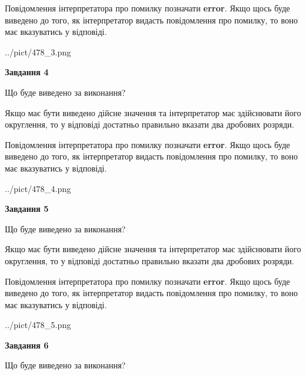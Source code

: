 \documentclass[12pt, ukrainian]{article}
\begin{document}
{\begin {Large}
Повідомлення інтерпретатора про помилку позначати \textbf{error}.
Якщо щось буде виведено до того, як інтерпретатор видасть повідомлення про помилку, 
то воно має вказуватись у відповіді. \par

\begin{center}
	{../pict/478_3.png}
\end{center}
\newpage

{\begin {center}\textbf{Завдання 4}\end {center}}\par
Що буде виведено за виконання? \par

Якщо має бути виведено дійсне значення та інтерпретатор має здійснювати його округлення, 
то у відповіді достатньо правильно вказати два дробових розряди.

Повідомлення інтерпретатора про помилку позначати \textbf{error}.
Якщо щось буде виведено до того, як інтерпретатор видасть повідомлення про помилку, 
то воно має вказуватись у відповіді. \par

\begin{center}
	{../pict/478_4.png}
\end{center}
\newpage

{\begin {center}\textbf{Завдання 5}\end {center}}\par
Що буде виведено за виконання? \par

Якщо має бути виведено дійсне значення та інтерпретатор має здійснювати його округлення, 
то у відповіді достатньо правильно вказати два дробових розряди.

Повідомлення інтерпретатора про помилку позначати \textbf{error}.
Якщо щось буде виведено до того, як інтерпретатор видасть повідомлення про помилку, 
то воно має вказуватись у відповіді. \par

\begin{center}
	{../pict/478_5.png}
\end{center}
\newpage

{\begin {center}\textbf{Завдання 6}\end {center}}\par
Що буде виведено за виконання? \par


\end{Large}}
\end{document}
